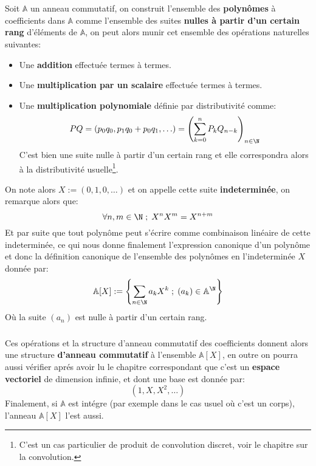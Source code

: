 \chapter*{} %
Soit \(\mathbb{A}\) un anneau commutatif, on construit l'ensemble des \textbf{polynômes} à coefficients dans \(\mathbb{A}\) comme l'ensemble des suites \textbf{nulles à partir d'un certain rang} d'éléments de \(\mathbb{A}\), on peut alors munir cet ensemble des opérations naturelles suivantes:
\begin{itemize}
   \item Une \textbf{addition} effectuée termes à termes.
   \item Une \textbf{multiplication par un scalaire} effectuée termes à termes.
   \item Une \textbf{multiplication polynomiale} définie par distributivité comme:
   \[ 
      PQ = (p_0q_0, p_1q_0 + p_0q_1, \ldots) = \left( \sum_{k=0}^n P_kQ_{n-k} \right)_{n \in \N} 
   \]
   C'est bien une suite nulle à partir d'un certain rang et elle correspondra alors à la distributivité usuelle\footnote[1]{C'est un cas particulier de produit de convolution discret, voir le chapitre sur la convolution.}.
\end{itemize}
On note alors \( X := (0, 1, 0, \ldots ) \) et on appelle cette suite \textbf{indeterminée}, on remarque alors que:
\[
   \forall n, m \in \N \; ; \; X^nX^m = X^{n + m}
\]
Et par suite que tout polynôme peut s'écrire comme combinaison linéaire de cette indeterminée, ce qui nous donne finalement l'expression canonique d'un polynôme et donc la définition canonique de l'ensemble des polynômes en l'indeterminée \( X \) donnée par:
\[ 
   \mathbb{A}[X] := \left\{ \sum_{n \in \N} a_kX^k \; ; \; (a_k) \in \mathbb{A}^\N \right\} 
\]
Où la suite \( (a_n) \) est nulle à partir d'un certain rang.
\subsection*{}
Ces opérations et la structure d'anneau commutatif des coefficients donnent alors une structure \textbf{d'anneau commutatif} à l'ensemble \( \mathbb{A}[X] \), en outre on pourra aussi vérifier aprés avoir lu le chapitre correspondant que c'est un \textbf{espace vectoriel} de dimension infinie, et dont une base est donnée par:
\[ 
   (1, X, X^2, \ldots) 
\]
Finalement, si \( \mathbb{A} \) est intégre (par exemple dans le cas usuel où c'est un corps), l'anneau \( \mathbb{A}[X] \) l'est aussi.
